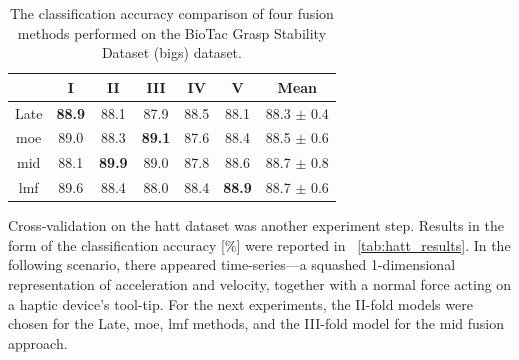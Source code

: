 \documentclass[a4paper, 10pt, twoside]{report}
\begin{document}
\begin{table}[H]
\centering
\caption{The classification accuracy comparison of four fusion methods performed on the BioTac Grasp Stability Dataset (\acrshort{bigs}) dataset.}
\begin{tabular}{ccccccc}
\toprule
\textbf{}                                                  & \textbf{I}                                                   & \textbf{II}                                                  & \textbf{III}                                                 & \textbf{IV}                 & \textbf{V}                  & \textbf{Mean}           \\ \midrule
\multicolumn{1}{c}{{\color[HTML]{000000} Late}} & \textbf{88.9}                      & {\color[HTML]{000000} 88.1}                                  & {\color[HTML]{000000} 87.9}                                  & {\color[HTML]{000000} 88.5} & {\color[HTML]{000000} 88.1} & 88.3 $\pm$ 0.4 \\ \midrule
\multicolumn{1}{c}{{\color[HTML]{000000} \acrshort{moe}}}  & \color[HTML]{000000} 89.0                                  & {\color[HTML]{000000} 88.3}                                  & {\color[HTML]{000000} \textbf{89.1}} & {\color[HTML]{000000} 87.6} & {\color[HTML]{000000} 88.4} & 88.5 $\pm$ 0.6 \\ \midrule
\multicolumn{1}{c}{{\color[HTML]{000000} \acrshort{mid}}}  & {\color[HTML]{000000} 88.1}                                  & \color[HTML]{000000} \textbf{89.9} & {\color[HTML]{000000} 89.0}                                  & {\color[HTML]{000000} 87.8} & {\color[HTML]{000000} 88.6} & 88.7 $\pm$ 0.8 \\ \midrule
\multicolumn{1}{c}{{\color[HTML]{000000} \acrshort{lmf}}}  & \color[HTML]{000000} 89.6 & {\color[HTML]{000000} 88.4}                                  & {\color[HTML]{000000} 88.0}                                  & {\color[HTML]{000000} 88.4} & {\color[HTML]{000000} \textbf{88.9}} & 88.7 $\pm$ 0.6 \\ \bottomrule
\end{tabular}  
\label{tab:bigs_results} 
\end{table}

Cross-validation on the \acrshort{hatt} dataset was another experiment step. Results in the form of the classification accuracy [\%] were reported in \Table~\ref{tab:hatt_results}. In the following scenario, there appeared time-series---a squashed 1-dimensional representation of acceleration and velocity, together with a normal force acting on a haptic device's tool-tip. For the next experiments, the II-fold models were chosen for the Late, \acrshort{moe}, \acrshort{lmf} methods, and the III-fold model for the \acrshort{mid} fusion approach.
\end{document}
